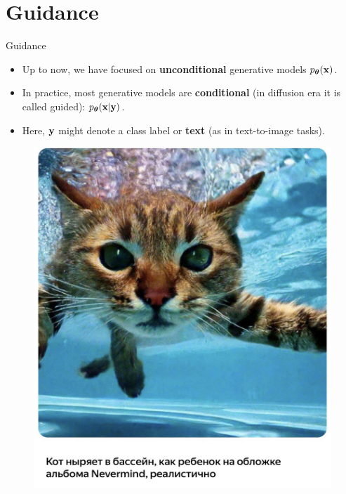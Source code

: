 \documentclass{beamer}
\begin{document}
\section{Guidance}
\begin{frame}{Guidance}
	\begin{itemize}
	\item Up to now, we have focused on \textbf{unconditional} generative models $p_{\boldsymbol{\theta}}(\mathbf{x})$.
	\item In practice, most generative models are \textbf{conditional} (in diffusion era it is called guided): $p_{\boldsymbol{\theta}}(\mathbf{x} | \mathbf{y})$.
	\item Here, $\mathbf{y}$ might denote a class label or \textbf{text} (as in text-to-image tasks).
	\end{itemize}
	\vspace{-0.3cm}
	\begin{minipage}[t]{0.5\columnwidth}
		\begin{figure}
			\includegraphics[width=0.9\linewidth]{figs/shedevrum1}
		\end{figure}
	\end{minipage}%
	\begin{minipage}[t]{0.5\columnwidth}
		\begin{figure}

\end{figure}
\end{minipage}
\end{frame}
\end{document}
